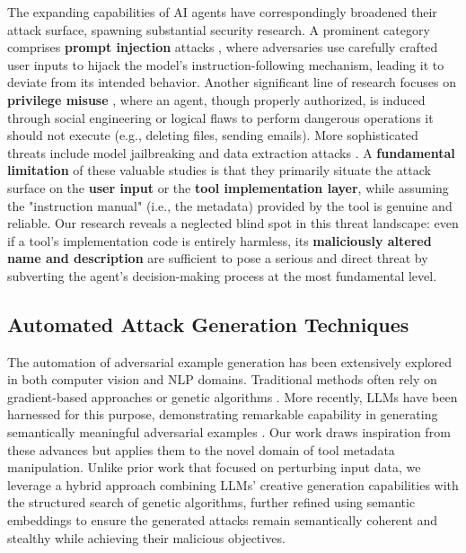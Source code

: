 The expanding capabilities of AI agents have correspondingly broadened their attack surface, spawning substantial security research. A prominent category comprises \textbf{prompt injection} attacks  \cite{yu2024assessingpromptinjectionrisks}, where adversaries use carefully crafted user inputs to hijack the model's instruction-following mechanism, leading it to deviate from its intended behavior. Another significant line of research focuses on \textbf{privilege misuse} \cite{kim2025promptflowintegrityprevent}, where an agent, though properly authorized, is induced through social engineering or logical flaws to perform dangerous operations it should not execute (e.g., deleting files, sending emails). More sophisticated threats include model jailbreaking \cite{zhang2024instructionbackdoorattackscustomized} and data extraction attacks \cite{shi2025promptinjectionattacktool}. A \textbf{fundamental limitation} of these valuable studies is that they primarily situate the attack surface on the \textbf{user input} or the \textbf{tool implementation layer}, while assuming the "instruction manual" (i.e., the metadata) provided by the tool is genuine and reliable. Our research reveals a neglected blind spot in this threat landscape: even if a tool's implementation code is entirely harmless, its \textbf{maliciously altered name and description} are sufficient to pose a serious and direct threat by subverting the agent's decision-making process at the most fundamental level.

\subsection{Automated Attack Generation Techniques}
The automation of adversarial example generation has been extensively explored in both computer vision and NLP domains. Traditional methods often rely on gradient-based approaches \cite{alzantot-etal-2018-generating} or genetic algorithms \cite{alzantot2019genattackpracticalblackboxattacks}. More recently, LLMs have been harnessed for this purpose, demonstrating remarkable capability in generating semantically meaningful adversarial examples \cite{paulus2025advprompterfastadaptiveadversarial}. Our work draws inspiration from these advances but applies them to the novel domain of tool metadata manipulation. Unlike prior work that focused on perturbing input data, we leverage a hybrid approach combining LLMs' creative generation capabilities with the structured search of genetic algorithms, further refined using semantic embeddings to ensure the generated attacks remain semantically coherent and stealthy while achieving their malicious objectives.


